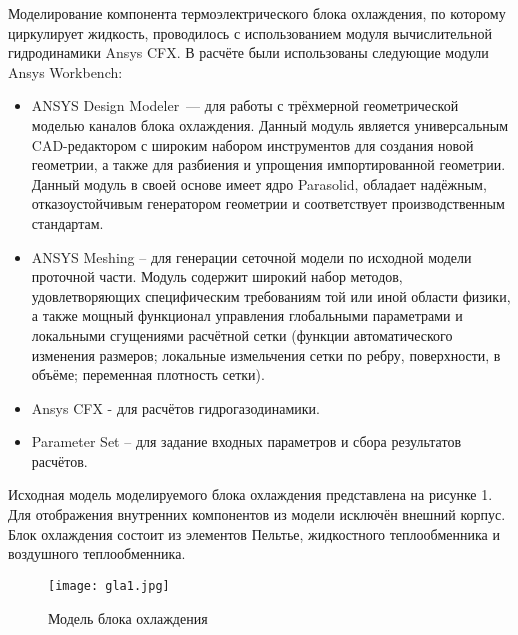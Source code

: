 


\vzmscaption


Моделирование компонента термоэлектрического блока охлаждения, по которому циркулирует жидкость, проводилось с использованием модуля вычислительной гидродинамики Ansys CFX.
В расчёте были использованы следующие модули Ansys Workbench:
\begin{itemize}
	\item
		ANSYS Design Modeler~--- для работы с трёхмерной геометрической моделью каналов блока охлаждения.
		Данный модуль является универсальным CAD-ре\-да\-к\-то\-ром с широким набором инструментов для создания новой геометрии, а также для разбиения и упрощения импортированной геометрии. Данный модуль в своей основе имеет ядро Parasolid, обладает надёжным, отказоустойчивым генератором геометрии и соответствует производственным стандартам.
	\item
		ANSYS Meshing – для генерации сеточной модели по исходной модели проточной части. Модуль содержит широкий набор методов, удовлетворяющих специфическим требованиям той или иной области физики, а также мощный функционал управления глобальными параметрами и локальными сгущениями расчётной сетки (функции автоматического изменения размеров; локальные измельчения сетки по ребру, поверхности, в объёме; переменная плотность сетки).
	\item
		Ansys CFX - для расчётов гидрогазодинамики.
	\item
		Parameter Set – для задание входных параметров и сбора результатов расчётов.
\end{itemize}
Исходная модель моделируемого блока охлаждения представлена на рисунке 1. Для отображения внутренних компонентов из модели исключён внешний корпус. Блок охлаждения состоит из элементов Пельтье, жидкостного теплообменника и воздушного теплообменника.

\begin{figure}[h!]
	\centering
	\texttt{[image: gla1.jpg]}
	\caption{Модель блока охлаждения}
\end{figure}


